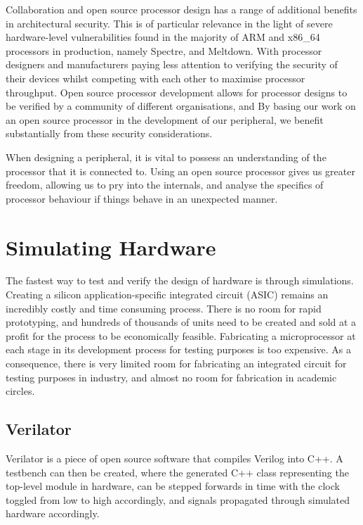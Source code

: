 \documentclass[a4paper,8pt]{report}
\begin{document}
Collaboration and open source processor
design has a range of additional benefits in architectural security. This is of
particular relevance in the light of severe hardware-level vulnerabilities found
in the majority of ARM and x86\_64 processors in production, namely Spectre, and
Meltdown. With processor designers and manufacturers paying less attention to
verifying the security of their devices whilst competing with each other to
maximise processor throughput. Open source processor development allows for
processor designs to be verified by a community of different organisations, and
By basing our work on an open source processor in the development of our
peripheral, we benefit substantially from these security considerations.

When designing a peripheral, it is vital to possess an understanding of the
processor that it is connected to. Using an open source processor gives us
greater freedom, allowing us to pry into the internals, and analyse the
specifics of processor behaviour if things behave in an unexpected manner.


\section{Simulating Hardware} 
The fastest way to test and verify the design of hardware is through simulations.
Creating a silicon application-specific integrated circuit (ASIC) remains an
incredibly costly and time consuming process.
There is no room for rapid prototyping, and hundreds of thousands of units need
to be created and sold at a profit for the process to be economically
feasible. Fabricating a microprocessor at each stage in its development process
for testing purposes is too expensive. As a consequence, there is very
limited room for fabricating an integrated circuit for testing purposes in
industry, and almost no room for fabrication in academic circles.

\subsection{Verilator}
Verilator is a piece of open source software that compiles Verilog into C++. A
testbench can then be created, where the generated C++ class representing the
top-level module in hardware, can be stepped forwards in time with the clock
toggled from low to high accordingly, and signals propagated through simulated
hardware accordingly.
\end{document}
